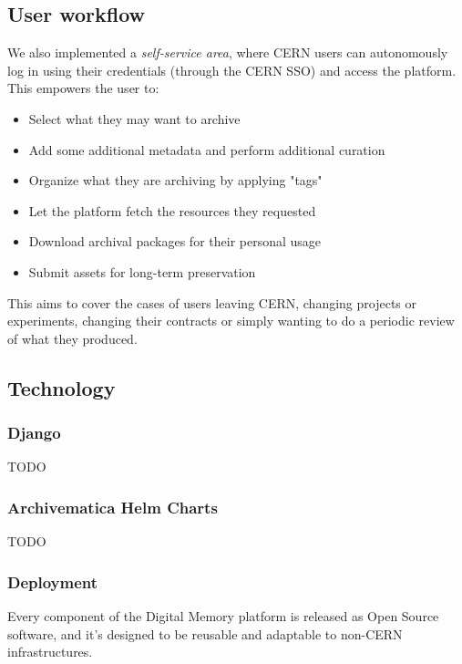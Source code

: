 \documentclass[11pt]{IEEEtran}
\begin{document}
\subsection{User workflow}

We also implemented a \textit{self-service area}, where CERN users can autonomously log in using their credentials (through the CERN SSO) and access the platform. This empowers the user to:

\begin{itemize}
    \item Select what they may want to archive
    \item Add some additional metadata and perform additional curation
    \item Organize what they are archiving by applying "tags"
    \item Let the platform fetch the resources they requested
    \item Download archival packages for their personal usage
    \item Submit assets for long-term preservation
\end{itemize}

This aims to cover the cases of users leaving CERN, changing projects or experiments, changing their contracts or simply wanting to do a periodic review of what they produced.

\subsection{Technology}

\subsubsection{Django}

TODO

\subsubsection{Archivematica Helm Charts}

TODO

\subsubsection{Deployment}

Every component of the Digital Memory platform is released as Open Source software, and it's designed to be reusable and adaptable to non-CERN infrastructures.
\end{document}
